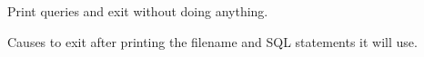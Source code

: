 \documentclass[letterpaper,10pt,english]{sphinxmanual}
\begin{document}
\begin{fulllineitems}
\label{\detokenize{mariadb-archiver:cmdoption-mariadb-archiver-dry-run}}
Print queries and exit without doing anything.

Causes  to exit after printing the filename and SQL statements
it will use.

\end{fulllineitems}

\end{document}
